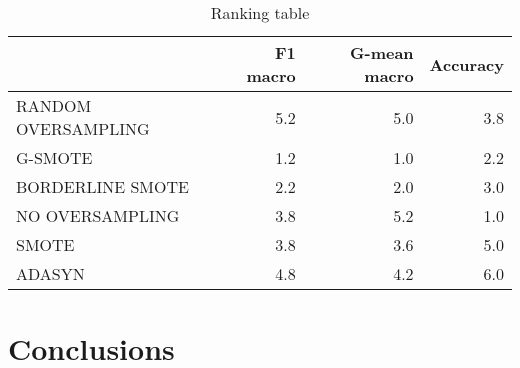 \documentclass[parskip=full]{scrartcl}
\begin{document}
\begin{table}[H]
	\centering
	\begin{tabular}{lrrr}
	\toprule
	{} &  F1 macro &  G-mean macro &  Accuracy \\
	\midrule
	RANDOM OVERSAMPLING &       5.2 &           5.0 &       3.8 \\
	G-SMOTE             &       1.2 &           1.0 &       2.2 \\
	BORDERLINE SMOTE    &       2.2 &           2.0 &       3.0 \\
	NO OVERSAMPLING     &       3.8 &           5.2 &       1.0 \\
	SMOTE               &       3.8 &           3.6 &       5.0 \\
	ADASYN              &       4.8 &           4.2 &       6.0 \\
	\bottomrule
	\end{tabular}
	\caption{\label{tab:rankings}Ranking table}
\end{table}


\section{Conclusions}





\end{document}
